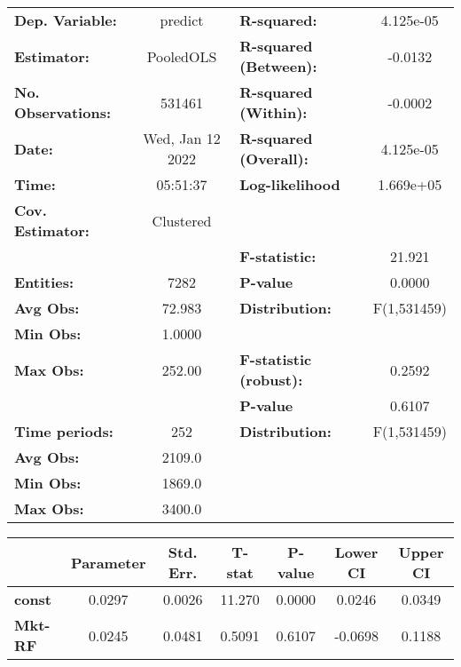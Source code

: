 \begin{center}
\begin{tabular}{lclc}
\toprule
\textbf{Dep. Variable:}    &      predict       & \textbf{  R-squared:         }   &    4.125e-05     \\
\textbf{Estimator:}        &     PooledOLS      & \textbf{  R-squared (Between):}  &     -0.0132      \\
\textbf{No. Observations:} &       531461       & \textbf{  R-squared (Within):}   &     -0.0002      \\
\textbf{Date:}             &  Wed, Jan 12 2022  & \textbf{  R-squared (Overall):}  &    4.125e-05     \\
\textbf{Time:}             &      05:51:37      & \textbf{  Log-likelihood     }   &    1.669e+05     \\
\textbf{Cov. Estimator:}   &     Clustered      & \textbf{                     }   &                  \\
\textbf{}                  &                    & \textbf{  F-statistic:       }   &      21.921      \\
\textbf{Entities:}         &        7282        & \textbf{  P-value            }   &      0.0000      \\
\textbf{Avg Obs:}          &       72.983       & \textbf{  Distribution:      }   &   F(1,531459)    \\
\textbf{Min Obs:}          &       1.0000       & \textbf{                     }   &                  \\
\textbf{Max Obs:}          &       252.00       & \textbf{  F-statistic (robust):} &      0.2592      \\
\textbf{}                  &                    & \textbf{  P-value            }   &      0.6107      \\
\textbf{Time periods:}     &        252         & \textbf{  Distribution:      }   &   F(1,531459)    \\
\textbf{Avg Obs:}          &       2109.0       & \textbf{                     }   &                  \\
\textbf{Min Obs:}          &       1869.0       & \textbf{                     }   &                  \\
\textbf{Max Obs:}          &       3400.0       & \textbf{                     }   &                  \\
\bottomrule
\end{tabular}
\begin{tabular}{lcccccc}
                & \textbf{Parameter} & \textbf{Std. Err.} & \textbf{T-stat} & \textbf{P-value} & \textbf{Lower CI} & \textbf{Upper CI}  \\
\midrule
\textbf{const}  &       0.0297       &       0.0026       &      11.270     &      0.0000      &       0.0246      &       0.0349       \\
\textbf{Mkt-RF} &       0.0245       &       0.0481       &      0.5091     &      0.6107      &      -0.0698      &       0.1188       \\
\bottomrule
\end{tabular}
\end{center}
